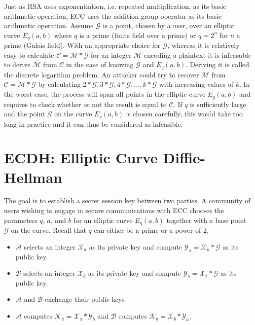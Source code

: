 Just as RSA uses exponentiation, i.e. repeated multiplication, as its basic arithmetic operation, ECC uses the addition group operator as its basic arithmetic operation. Assume $\mathcal{G}$ is a point, chosen by a user, over an elliptic curve $E_q(a,b)$ where $q$ is a prime (finite field over a prime) or $q=2^n$ for $n$ a prime (Galois field). With an appropriate choice for $\mathcal{G}$, whereas it is relatively easy to calculate $\mathcal{C} = \mathcal{M} * \mathcal{G}$ for an integer $\mathcal{M}$ encoding a plaintext it is infeasable to derive $\mathcal{M}$ from $\mathcal{C}$ in the case of knowing $\mathcal{G}$ and $E_q(a,b)$. Deriving it is called the discrete logarithm problem. An attacker could try to recover $\mathcal{M}$ from $\mathcal{C} = \mathcal{M} * \mathcal{G}$ by calculating $2*\mathcal{G}, 3*\mathcal{G}, 4*\mathcal{G}, \ldots , k*\mathcal{G}$ with increasing values of $k$. In the worst case, the process will span all points in the elliptic curve $E_q(a,b)$ and requires to check whether or not the result is equal to $\mathcal{C}$. If $q$ is sufficiently large and the point $\mathcal{G}$ on the curve $E_q (a,b)$ is chosen carefully, this would take too long in practice and it can thus be considered as infeasible.


\section{ECDH: Elliptic Curve Diffie-Hellman}
The goal is to establish a secret session key between two parties. A community of users wishing to engage in secure communications with ECC chooses the parameters $q$, $a$, and $b$ for an elliptic curve $E_q(a,b)$ together with a base point $\mathcal{G}$ on the curve. Recall that $q$ can either be a prime or a power of $2$.

\begin{itemize}
	\item $\mathcal{A}$ selects an integer $\mathcal{X}_a$ as its private key and compute $\mathcal{Y}_a = \mathcal{X}_a * \mathcal{G}$ as its public key. 
	\item $\mathcal{B}$ selects an integer $\mathcal{X}_b$ as its private key and compute $\mathcal{Y}_b = \mathcal{X}_b * \mathcal{G}$ as its public key. 
	\item $\mathcal{A}$ and $\mathcal{B}$ exchange their public keys
	\item $\mathcal{A}$ computes $\mathcal{K}_a = \mathcal{X}_a * \mathcal{Y}_b$ and $\mathcal{B}$ computes $\mathcal{K}_b = \mathcal{X}_b * \mathcal{Y}_a$. 
\end{itemize}

